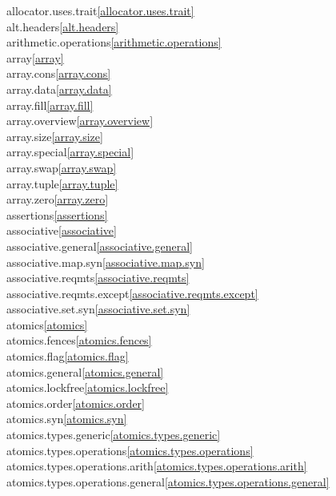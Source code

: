 \begin{multicols}{2}
allocator.uses.trait\quad\ref{allocator.uses.trait}\\
alt.headers\quad\ref{alt.headers}\\
arithmetic.operations\quad\ref{arithmetic.operations}\\
array\quad\ref{array}\\
array.cons\quad\ref{array.cons}\\
array.data\quad\ref{array.data}\\
array.fill\quad\ref{array.fill}\\
array.overview\quad\ref{array.overview}\\
array.size\quad\ref{array.size}\\
array.special\quad\ref{array.special}\\
array.swap\quad\ref{array.swap}\\
array.tuple\quad\ref{array.tuple}\\
array.zero\quad\ref{array.zero}\\
assertions\quad\ref{assertions}\\
associative\quad\ref{associative}\\
associative.general\quad\ref{associative.general}\\
associative.map.syn\quad\ref{associative.map.syn}\\
associative.reqmts\quad\ref{associative.reqmts}\\
associative.reqmts.except\quad\ref{associative.reqmts.except}\\
associative.set.syn\quad\ref{associative.set.syn}\\
atomics\quad\ref{atomics}\\
atomics.fences\quad\ref{atomics.fences}\\
atomics.flag\quad\ref{atomics.flag}\\
atomics.general\quad\ref{atomics.general}\\
atomics.lockfree\quad\ref{atomics.lockfree}\\
atomics.order\quad\ref{atomics.order}\\
atomics.syn\quad\ref{atomics.syn}\\
atomics.types.generic\quad\ref{atomics.types.generic}\\
atomics.types.operations\quad\ref{atomics.types.operations}\\
atomics.types.operations.arith\quad\ref{atomics.types.operations.arith}\\
atomics.types.operations.general\quad\ref{atomics.types.operations.general}\\

\end{multicols}
